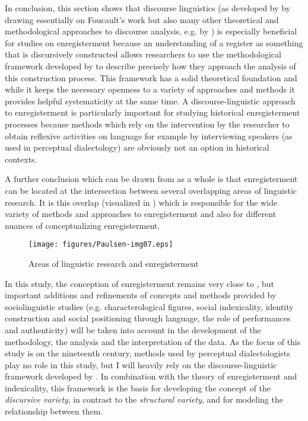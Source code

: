 In conclusion, this section shows that discourse linguistics (as developed by \citealt{Spitzmuller2011} by drawing essentially on Foucault’s work but also many other theoretical and methodological approaches to discourse analysis, e.g. by \citealt{Blommaert2005}) is especially beneficial for studies on enregisterment because an understanding of a register as something that is discursively constructed allows researchers to use the methodological framework developed by \citet{Spitzmuller2011} to describe precisely how they approach the analysis of this construction process. This framework has a solid theoretical foundation and while it keeps the necessary openness to a variety of approaches and methods it provides helpful systematicity at the same time. A discourse-linguistic approach to enregisterment is particularly important for studying historical enregisterment processes because methods which rely on the intervention by the researcher to obtain reflexive activities on language for example by interviewing speakers (as used in perceptual dialectology) are obviously not an option in historical contexts.

A further conclusion which can be drawn from  as a whole is that enregisterment can be located at the intersection between several overlapping areas of linguistic research. It is this overlap (visualized in ) which is responsible for the wide variety of methods and approaches to enregisterment and also for different nuances of conceptualizing enregisterment.


\begin{figure}
\texttt{[image: figures/Paulsen-img07.eps]}
\caption{
Areas of linguistic research and enregisterment
}
\label{fig:2:7}
\end{figure}

In this study, the conception of enregisterment remains very close to \citet{Agha2003, Agha2007}, but important additions and refinements of concepts and methods provided by sociolinguistic studies (e.g. characterological figures, social indexicality, identity construction and social positioning through language, the role of performances and authenticity) will be taken into account in the development of the methodology, the analysis and the interpretation of the data. As the focus of this study is on the nineteenth century, methods used by perceptual dialectologists play no role in this study, but I will heavily rely on the discourse-linguistic framework developed by \citet{Spitzmuller2011}. In combination with the theory of enregisterment and indexicality, this framework is the basis for developing the concept of the \textit{discursive variety}, in contrast to the \textit{structural variety}, and for modeling the relationship between them.



